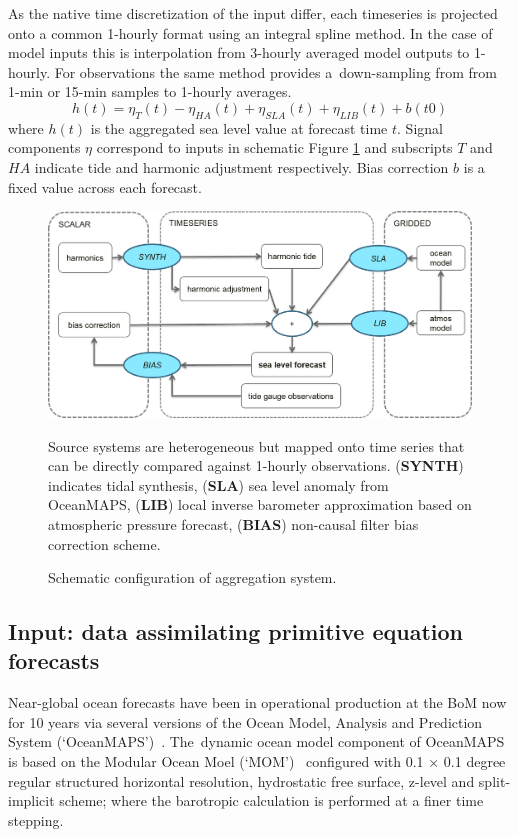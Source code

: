 As the native time discretization of the input differ, each timeseries is projected onto a common 1-hourly format using an integral spline method.  
In the case of model inputs this is interpolation from 3-hourly averaged model outputs to 1-hourly.  
For observations the same method provides a~down-sampling from from 1-min or 15-min samples to 1-hourly averages.  
\begin{equation}
h(t) = \eta_{T}(t) - \eta_{HA}(t) + \eta_{SLA}(t) + \eta_{LIB}(t) + b(t0)
\label{eq:aggSL}
\end{equation}
where $h(t)$ is the aggregated sea level value at forecast time $t$.  
Signal components $\eta$ correspond to inputs in schematic Figure \ref{fig:aggSL} and subscripts $T$ and $HA$ indicate tide and harmonic adjustment respectively.    
Bias correction $b$ is a fixed value across each forecast.
\begin{figure}[!hbt] \centering
\includegraphics[width=1.0\textwidth]{figures/diagrams/aggSL_schematic_abstract.png}
\caption{Schematic configuration of aggregation system.}
{Source systems are heterogeneous but mapped onto time series that can be directly compared against 1-hourly observations.  (\textbf{SYNTH}) indicates tidal synthesis, (\textbf{SLA}) sea level anomaly from OceanMAPS, (\textbf{LIB}) local inverse barometer approximation based on atmospheric pressure forecast, (\textbf{BIAS}) non-causal filter bias correction scheme. }
\label{fig:aggSL}
\end{figure}   


\subsection{Input: data assimilating primitive equation forecasts }
\label{sec:dynamicmodels}

Near-global ocean forecasts have been in operational production at the BoM now for 10 years via several versions of the Ocean Model, Analysis and Prediction System (`OceanMAPS')~\citep{Brassington:2007ut,NMOC:2007wq,BureauofMeterology:2011ta,Brassington:2012wm}.
The~dynamic ocean model component of OceanMAPS is based on the Modular Ocean Moel (`MOM')~\citep{Griffies:2008vh} configured with 0.1 $\times$ 0.1 degree regular structured horizontal resolution, hydrostatic free surface, z-level and split-implicit scheme; where the barotropic calculation is performed at a finer time stepping. 

